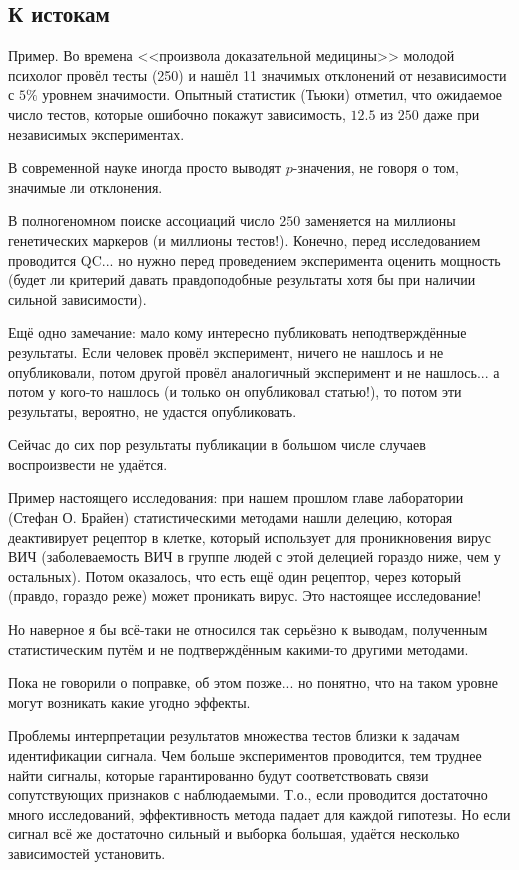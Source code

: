\documentclass[main.tex]{subfiles}
\begin{document}
\subsection{К истокам}

Пример.
Во времена <<произвола доказательной медицины>> молодой психолог провёл тесты (250) и нашёл 11 значимых отклонений от независимости с $ 5\% $ уровнем значимости.
Опытный статистик (Тьюки) отметил, что ожидаемое число тестов, которые ошибочно покажут зависимость, $ 12.5 $ из $ 250 $ даже при независимых экспериментах.

В современной науке иногда просто выводят $p$-значения, не говоря о том, значимые ли отклонения.

В полногеномном поиске ассоциаций число $250$ заменяется на миллионы генетических маркеров (и миллионы тестов!).
Конечно, перед исследованием проводится QC...
но нужно перед проведением эксперимента оценить мощность (будет ли критерий давать правдоподобные результаты хотя бы при наличии сильной зависимости).

Ещё одно замечание: мало кому интересно публиковать неподтверждённые результаты.
Если человек провёл эксперимент, ничего не нашлось и не опубликовали, потом другой провёл аналогичный эксперимент и не нашлось... а потом у кого-то нашлось (и только он опубликовал статью!), то потом эти результаты, вероятно, не удастся опубликовать.

Сейчас до сих пор результаты публикации в большом числе случаев воспроизвести не удаётся.

Пример настоящего исследования: при нашем прошлом главе лаборатории (Стефан О. Брайен) статистическими методами нашли делецию, которая деактивирует рецептор в клетке, который использует для проникновения вирус ВИЧ (заболеваемость ВИЧ в группе людей с этой делецией гораздо ниже, чем у остальных).
Потом оказалось, что есть ещё один рецептор, через который (правдо, гораздо реже) может проникать вирус.
Это настоящее исследование!

Но наверное я бы всё-таки не относился так серьёзно к выводам, полученным статистическим путём и не подтверждённым какими-то другими методами.


Пока не говорили о поправке, об этом позже...
но понятно, что на таком уровне могут возникать какие угодно эффекты.


Проблемы интерпретации результатов множества тестов близки к задачам идентификации сигнала.
Чем больше экспериментов проводится, тем труднее найти сигналы, которые гарантированно будут соответствовать связи сопутствующих признаков с наблюдаемыми.
Т.о., если проводится достаточно много исследований, эффективность метода падает для каждой гипотезы.
Но если сигнал всё же достаточно сильный и выборка большая, удаётся несколько зависимостей установить.
\end{document}
